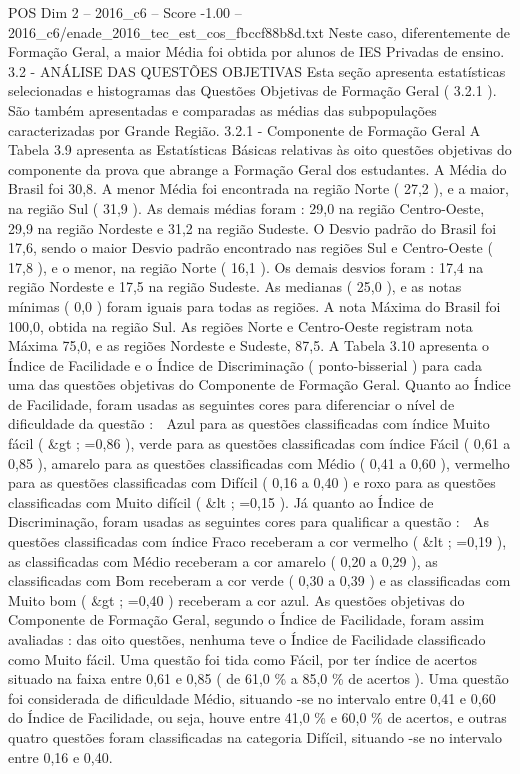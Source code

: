 \begin{textsample}{POS Dim 2 – 2016\_c6 – Score -1.00 – 2016\_c6/enade\_2016\_tec\_est\_cos\_fbccf88b8d.txt}
Neste caso, diferentemente de Formação Geral, a maior Média foi obtida por alunos de IES Privadas de ensino. 3.2 - ANÁLISE DAS QUESTÕES OBJETIVAS Esta seção apresenta estatísticas selecionadas e histogramas das Questões Objetivas de Formação Geral ( 3.2.1 ).
São também apresentadas e comparadas as médias das subpopulações caracterizadas por Grande Região. 3.2.1 - Componente de Formação Geral A Tabela 3.9 apresenta as Estatísticas Básicas relativas às oito questões objetivas do componente da prova que abrange a Formação Geral dos estudantes.
A Média do Brasil foi 30,8.
A menor Média foi encontrada na região Norte ( 27,2 ), e a maior, na região Sul ( 31,9 ).
As demais médias foram : 29,0 na região Centro-Oeste, 29,9 na região Nordeste e 31,2 na região Sudeste.
O Desvio padrão do Brasil foi 17,6, sendo o maior Desvio padrão encontrado nas regiões Sul e Centro-Oeste ( 17,8 ), e o menor, na região Norte ( 16,1 ).
Os demais desvios foram : 17,4 na região Nordeste e 17,5 na região Sudeste.
As medianas ( 25,0 ), e as notas mínimas ( 0,0 ) foram iguais para todas as regiões.
A nota Máxima do Brasil foi 100,0, obtida na região Sul.
As regiões Norte e Centro-Oeste registram nota Máxima 75,0, e as regiões Nordeste e Sudeste, 87,5.
A Tabela 3.10 apresenta o Índice de Facilidade e o Índice de Discriminação ( ponto-bisserial ) para cada uma das questões objetivas do Componente de Formação Geral.
Quanto ao Índice de Facilidade, foram usadas as seguintes cores para diferenciar o nível de dificuldade da questão :  Azul para as questões classificadas com índice Muito fácil ( \&gt ; =0,86 ), verde para as questões classificadas com índice Fácil ( 0,61 a 0,85 ), amarelo para as questões classificadas com Médio ( 0,41 a 0,60 ), vermelho para as questões classificadas com Difícil ( 0,16 a 0,40 ) e roxo para as questões classificadas com Muito difícil ( \&lt ; =0,15 ).
Já quanto ao Índice de Discriminação, foram usadas as seguintes cores para qualificar a questão :  As questões classificadas com índice Fraco receberam a cor vermelho ( \&lt ; =0,19 ), as classificadas com Médio receberam a cor amarelo ( 0,20 a 0,29 ), as classificadas com Bom receberam a cor verde ( 0,30 a 0,39 ) e as classificadas com Muito bom ( \&gt ; =0,40 ) receberam a cor azul.
As questões objetivas do Componente de Formação Geral, segundo o Índice de Facilidade, foram assim avaliadas : das oito questões, nenhuma teve o Índice de Facilidade classificado como Muito fácil.
Uma questão foi tida como Fácil, por ter índice de acertos situado na faixa entre 0,61 e 0,85 ( de 61,0 \% a 85,0 \% de acertos ).
Uma questão foi considerada de dificuldade Médio, situando -se no intervalo entre 0,41 e 0,60 do Índice de Facilidade, ou seja, houve entre 41,0 \% e 60,0 \% de acertos, e outras quatro questões foram classificadas na categoria Difícil, situando -se no intervalo entre 0,16 e 0,40.

\end{textsample}
